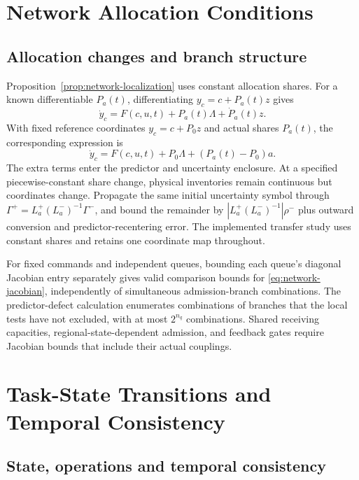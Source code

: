\documentclass[preprint,12pt]{elsarticle}
\begin{document}
\section{Network Allocation Conditions}
\label{app:network-assumptions}

\subsection{Allocation changes and branch structure}

Proposition~\ref{prop:network-localization} uses constant allocation shares.
For a known differentiable $P_a(t)$, differentiating $y_c=c+P_a(t)z$ gives
\begin{equation}
 \dot y_c=F(c,u,t)+P_a(t)\Lambda+\dot P_a(t)z.
 \label{eq:network-varying-allocation}
\end{equation}
With fixed reference coordinates $y_c=c+P_0z$ and actual shares $P_a(t)$,
the corresponding expression is
\begin{equation}
 \dot y_c=F(c,u,t)+P_0\Lambda+(P_a(t)-P_0)a.
 \label{eq:network-uncertain-allocation}
\end{equation}
The extra terms enter the predictor and uncertainty enclosure. At a specified
piecewise-constant share change, physical inventories remain continuous but
coordinates change. Propagate the same initial uncertainty symbol through
$\Gamma^+=L_a^+(L_a^-)^{-1}\Gamma^-$, and bound the remainder by
$|L_a^+(L_a^-)^{-1}|\rho^-$ plus outward conversion and predictor-recentering
error. The implemented
transfer study uses constant shares and retains one coordinate map throughout.

For fixed commands and independent queues, bounding each queue's diagonal
Jacobian entry separately gives valid comparison bounds for
\eqref{eq:network-jacobian}, independently of simultaneous admission-branch
combinations. The predictor-defect calculation enumerates combinations of
branches that the local tests have not excluded, with at most $2^{n_q}$
combinations. Shared receiving capacities, regional-state-dependent
admission, and feedback gates require Jacobian bounds that include their
actual couplings.

\section{Task-State Transitions and Temporal Consistency}
\label{app:task-state-compiler}

\subsection{State, operations and temporal consistency}
\end{document}
